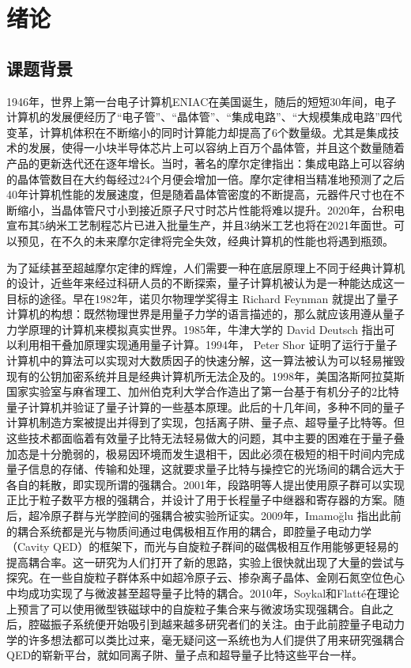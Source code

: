 
\chapter{绪论}
\label{ch1}

\section{课题背景}
1946年，世界上第一台电子计算机ENIAC在美国诞生，随后的短短30年间，电子计算机的发展便经历了“电子管”、“晶体管”、“集成电路”、“大规模集成电路”四代变革，计算机体积在不断缩小的同时计算能力却提高了6个数量级。尤其是集成技术的发展，使得一小块半导体芯片上可以容纳上百万个晶体管，并且这个数量随着产品的更新迭代还在逐年增长。当时，著名的摩尔定律指出：集成电路上可以容纳的晶体管数目在大约每经过24个月便会增加一倍。摩尔定律相当精准地预测了之后40年计算机性能的发展速度，但是随着晶体管密度的不断提高，元器件尺寸也在不断缩小，当晶体管尺寸小到接近原子尺寸时芯片性能将难以提升。2020年，台积电宣布其5纳米工艺制程芯片已进入批量生产，并且3纳米工艺也将在2021年面世。可以预见，在不久的未来摩尔定律将完全失效，经典计算机的性能也将遇到瓶颈。

为了延续甚至超越摩尔定律的辉煌，人们需要一种在底层原理上不同于经典计算机的设计，近些年来经过科研人员的不断探索，量子计算机被认为是一种能达成这一目标的途径。早在1982年，诺贝尔物理学奖得主 Richard Feynman 就提出了量子计算机的构想：既然物理世界是用量子力学的语言描述的，那么就应该用遵从量子力学原理的计算机来模拟真实世界\cite{feynman1982quantum}。1985年，牛津大学的 David Deutsch 指出可以利用相干叠加原理实现通用量子计算。1994年， Peter Shor 证明了运行于量子计算机中的算法可以实现对大数质因子的快速分解，这一算法被认为可以轻易摧毁现有的公钥加密系统并且是经典计算机所无法企及的。1998年，美国洛斯阿拉莫斯国家实验室与麻省理工、加州伯克利大学合作造出了第一台基于有机分子的2比特量子计算机并验证了量子计算的一些基本原理。此后的十几年间，多种不同的量子计算机制造方案被提出并得到了实现，包括离子阱、量子点、超导量子比特等。但这些技术都面临着有效量子比特无法轻易做大的问题，其中主要的困难在于量子叠加态是十分脆弱的，极易因环境而发生退相干，因此必须在极短的相干时间内完成量子信息的存储、传输和处理，这就要求量子比特与操控它的光场间的耦合远大于各自的耗散，即实现所谓的强耦合。2001年，段路明等人提出使用原子群可以实现正比于粒子数平方根的强耦合，并设计了用于长程量子中继器和寄存器的方案。随后，超冷原子群与光学腔间的强耦合被实验所证实。2009年，Imamo\u{g}lu 指出此前的耦合系统都是光与物质间通过电偶极相互作用的耦合，即腔量子电动力学（Cavity QED）的框架下，而光与自旋粒子群间的磁偶极相互作用能够更轻易的提高耦合率\cite{PhysRevLett.102.083602Imamoifmmode}。这一研究为人们打开了新的思路，实验上很快就出现了大量的尝试与探究。在一些自旋粒子群体系中如超冷原子云、掺杂离子晶体、金刚石氮空位色心中均成功实现了与微波甚至超导量子比特的耦合。2010年，Soykal和Flatt\'e在理论上预言了可以使用微型铁磁球中的自旋粒子集合来与微波场实现强耦合\cite{PhysRevLett.104.077202Soykal}。自此之后，腔磁振子系统便开始吸引到越来越多研究者们的关注。由于此前腔量子电动力学的许多想法都可以类比过来，毫无疑问这一系统也为人们提供了用来研究强耦合QED的崭新平台，就如同离子阱、量子点和超导量子比特这些平台一样。

